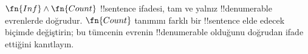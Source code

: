 \documentclass[../../../include/open-logic-section]{subfiles}
\begin{document}
\begin{prob}
$\fn{Inf} \land \fn{Count}$ !!{sentence} ifadesi, tam ve yalnız
!!{denumerable} evrenlerde doğrudur. $\fn{Count}$ tanımını farklı bir
!!{sentence} elde edecek biçimde değiştirin; bu tümcenin evrenin
!!{denumerable} olduğunu doğrudan ifade ettiğini kanıtlayın.
\end{prob}
\end{document}
